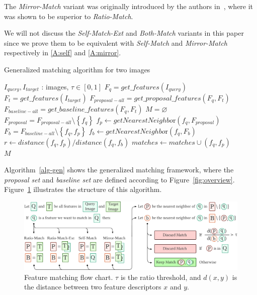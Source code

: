 \documentclass[review]{elsarticle}
\begin{document}
The \emph{Mirror-Match} variant was originally introduced by the authors in~\cite{arnfred2013mirror}, where it was shown to be superior to \emph{Ratio-Match}. %

We will not discuss the \emph{Self-Match-Ext} and \emph{Both-Match} variants in this paper since we prove them to be equivalent with \emph{Self-Match} and \emph{Mirror-Match} respectively in \ref{A:self} and \ref{A:mirror}.

\begin{algorithm}[htb]
\caption{Generalized matching algorithm for two images}
\label{alg-gen}
\begin{algorithmic}
    \Require $I_{query}, I_{target}$ : images, $\tau \in [0,1]$
    \State $F_{q} = get\_features(I_{query})$
    \State $F_{t} = get\_features(I_{target})$
\State $F_{proposal-all} = get\_proposal\_features(F_{q}, 
F_{t})$
\State $F_{baseline-all} = get\_baseline\_features(F_{q}, 
F_{t})$
\State $M = \varnothing$
    \State $F_{proposal} = F_{proposal-all} \setminus 
    \left\{f_q\right\}$
    \State $f_p \gets getNearestNeighbo\text{r}(f_q, F_{proposal})$
    \State $F_{b} = F_{baseline-all} \setminus \left\{f_q, 
    f_p\right\}$
    \State $f_b \gets getNearestNeighbo\text{r}(f_q, F_{b})$
    \State $r \gets distance(f_q, f_p) / distance(f_q, f_b)$
        \State $matches \gets matches \cup \left(f_q, f_p\right)$
	\EndIf
\EndFor \\
\Return $M$
\end{algorithmic}
\end{algorithm}

Algorithm~\ref{alg-gen} shows the generalized matching framework, where the \emph{proposal set} and \emph{baseline set} are defined according to Figure~\ref{fig:overview}. Figure~\ref{fig:matching} illustrates the structure of this algorithm.


\begin{figure}[htb]
\centering
\includegraphics[width=\columnwidth]{images/matching-wide}
\caption{Feature matching flow chart. $\tau$ 
is the ratio threshold, and $d(x,y)$ is the distance between two feature 
descriptors $x$ and $y$.}
\label{fig:matching}
\end{figure}
%
\end{document}
